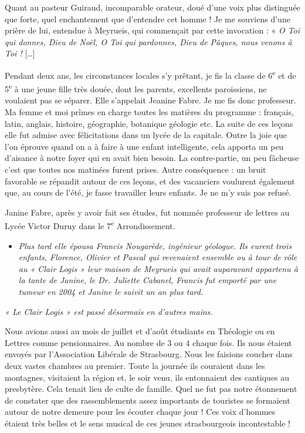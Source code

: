 
Quant au pasteur Guiraud, incomparable orateur, doué d’une voix plus distinguée que
forte, quel enchantement que d’entendre cet homme ! Je me souviens d’une prière de
lui, entendue à Meyrueis, qui commençait par cette invocation : « \emph{O Toi qui donnes,
Dieu de Noël, O Toi qui pardonnes, Dieu de Pâques, nous venons à Toi !} [\ldots]

Pendant deux ans, les circonstances locales s’y prêtant, je fis la classe de 6\textsuperscript{e} et de 5\textsuperscript{e} à
une jeune fille très douée, dont les parents, excellents paroissiens, ne voulaient pas se
séparer. Elle s’appelait Jeanine Fabre.
Je me fis donc professeur. Ma femme et moi prîmes en charge toutes les matières du
programme : français, latin, anglais, histoire, géographie, botanique géologie etc. La
suite de ces leçons elle fut admise avec félicitations dans un lycée de la capitale. Outre
la joie que l’on éprouve quand on a à faire à une enfant intelligente, cela apporta un
peu d’aisance à notre foyer qui en avait bien besoin. La contre-partie, un peu fâcheuse
c’est que toutes nos matinées furent prises. Autre conséquence : un bruit favorable se
répandit autour de ces leçons, et des vacanciers voulurent également que, au cours de
l’été, je fasse travailler leurs enfants. Je ne m’y suis pas refusé.

Janine Fabre, après y avoir fait ses études, fut nommée professeur de lettres au Lycée
Victor Duruy dans le 7\textsuperscript{e} Arrondissement.

\begin{itemize}
\item \emph{Plus tard elle épousa Francis Nougarède, ingénieur géologue. Ils eurent trois enfants,
Florence, Olivier et Pascal qui revenaient ensemble ou à tour de rôle au « Clair Logis »
leur maison de Meyrueis qui avait auparavant appartenu à la tante de Janine, le Dr. Juliette
Cabanel,
Francis fut emporté par une tumeur en 2004 et Janine le suivit un an plus tard.}
\end{itemize}

\emph{« Le Clair Logis » est passé désormais en d’autres mains.}

Nous avions aussi au mois de juillet et d’août étudiants en Théologie ou en Lettres
comme pensionnaires. Au nombre de 3 ou 4 chaque fois. Ils nous étaient envoyés par
l’Association Libérale de Strasbourg. Nous les faisions coucher dans deux vastes
chambres au premier. Toute la journée ils couraient dans les montagnes, visitaient la
région et, le soir venu, ils entonnaient des cantiques au presbytère. Cela tenait lieu de
culte de famille. Quel ne fut pas notre étonnement de constater que des
rassemblements assez importants de touristes se formaient autour de notre demeure
pour les écouter chaque jour ! Ces voix d’hommes étaient très belles et le sens musical
de ces jeunes strasbourgeois incontestable !

